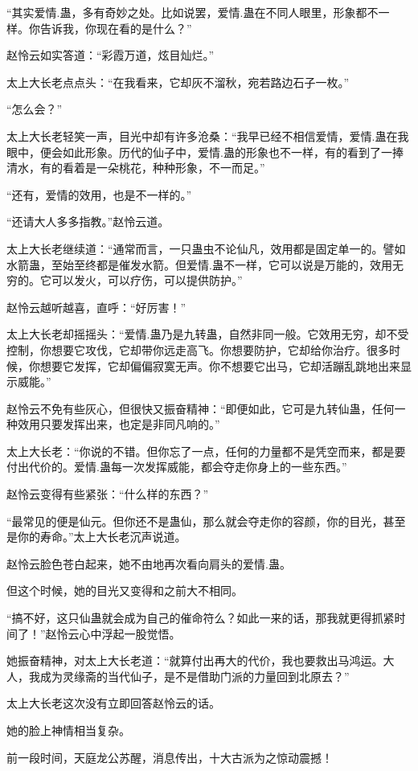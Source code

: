 \begin{this_body}
“其实爱情.蛊，多有奇妙之处。比如说罢，爱情.蛊在不同人眼里，形象都不一样。你告诉我，你现在看的是什么？”

赵怜云如实答道：“彩霞万道，炫目灿烂。”

太上大长老点点头：“在我看来，它却灰不溜秋，宛若路边石子一枚。”

“怎么会？”

太上大长老轻笑一声，目光中却有许多沧桑：“我早已经不相信爱情，爱情.蛊在我眼中，便会如此形象。历代的仙子中，爱情.蛊的形象也不一样，有的看到了一捧清水，有的看着是一朵桃花，种种形象，不一而足。”

“还有，爱情的效用，也是不一样的。”

“还请大人多多指教。”赵怜云道。

太上大长老继续道：“通常而言，一只蛊虫不论仙凡，效用都是固定单一的。譬如水箭蛊，至始至终都是催发水箭。但爱情.蛊不一样，它可以说是万能的，效用无穷的。它可以发火，可以疗伤，可以提供防护。”

赵怜云越听越喜，直呼：“好厉害！”

太上大长老却摇摇头：“爱情.蛊乃是九转蛊，自然非同一般。它效用无穷，却不受控制，你想要它攻伐，它却带你远走高飞。你想要防护，它却给你治疗。很多时候，你想要它发挥，它却偏偏寂寞无声。你不想要它出马，它却活蹦乱跳地出来显示威能。”

赵怜云不免有些灰心，但很快又振奋精神：“即便如此，它可是九转仙蛊，任何一种效用只要发挥出来，也定是非同凡响的。”

太上大长老：“你说的不错。但你忘了一点，任何的力量都不是凭空而来，都是要付出代价的。爱情.蛊每一次发挥威能，都会夺走你身上的一些东西。”

赵怜云变得有些紧张：“什么样的东西？”

“最常见的便是仙元。但你还不是蛊仙，那么就会夺走你的容颜，你的目光，甚至是你的寿命。”太上大长老沉声说道。

赵怜云脸色苍白起来，她不由地再次看向肩头的爱情.蛊。

但这个时候，她的目光又变得和之前大不相同。

“搞不好，这只仙蛊就会成为自己的催命符么？如此一来的话，那我就更得抓紧时间了！”赵怜云心中浮起一股觉悟。

她振奋精神，对太上大长老道：“就算付出再大的代价，我也要救出马鸿运。大人，我成为灵缘斋的当代仙子，是不是借助门派的力量回到北原去？”

太上大长老这次没有立即回答赵怜云的话。

她的脸上神情相当复杂。

前一段时间，天庭龙公苏醒，消息传出，十大古派为之惊动震撼！


\end{this_body}
